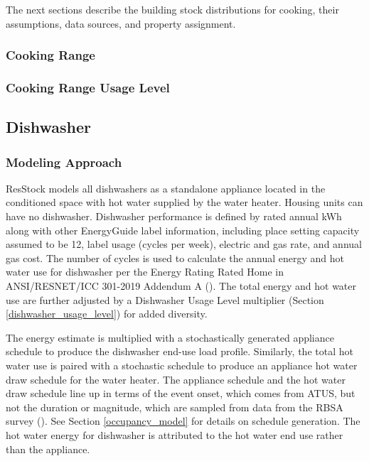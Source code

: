 The next sections describe the building stock distributions for cooking, their assumptions, data sources, and property assignment.

\subsubsection{Cooking Range}


\subsubsection{Cooking Range Usage Level}\label{cooking_range_usage_level}


\subsection{Dishwasher}
\subsubsection{Modeling Approach}
ResStock models all dishwashers as a standalone appliance located in the conditioned space with hot water supplied by the water heater. Housing units can have no dishwasher. Dishwasher performance is defined by rated annual kWh along with other EnergyGuide label information, including place setting capacity assumed to be 12, label usage (cycles per week), electric and gas rate, and annual gas cost.
The number of cycles is used to calculate the annual energy and hot water use for dishwasher per the Energy Rating Rated Home in ANSI/RESNET/ICC 301-2019 Addendum A (\cite{ansi_resnet_301_2019}). The total energy and hot water use are further adjusted by a Dishwasher Usage Level multiplier (Section \ref{dishwasher_usage_level}) for added diversity.

The energy estimate is multiplied with a stochastically generated appliance schedule to produce the dishwasher end-use load profile. Similarly, the total hot water use is paired with a stochastic schedule to produce an appliance hot water draw schedule for the water heater. The appliance schedule and the hot water draw schedule line up in terms of the event onset, which comes from ATUS, but not the duration or magnitude, which are sampled from data from the RBSA survey (\cite{RBSA}). See Section \ref{occupancy_model} for details on schedule generation. The hot water energy for dishwasher is attributed to the hot water end use rather than the appliance.

